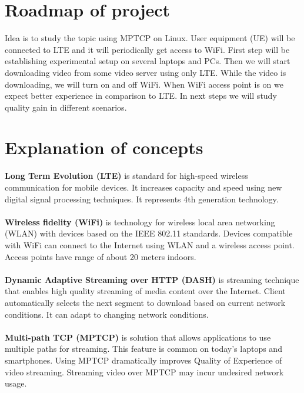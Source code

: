 \documentclass{llncs}
\begin{document}
\section{Roadmap of project}
Idea is to study the topic using MPTCP on Linux. User equipment (UE) will be connected to LTE and it will periodically get access to WiFi. First step will be establishing experimental setup on several laptops and PCs. Then we will start downloading video from some video server using only LTE. While the video is downloading, we will turn on and off WiFi. When WiFi access point is on we expect better experience in comparison to LTE.  In next steps we will study quality gain in different scenarios. 


\section{Explanation of concepts}
\textbf{Long Term Evolution (LTE)} is standard for high-speed wireless communication for mobile devices. It increases capacity and speed using new digital signal processing techniques. It represents 4th generation technology. \\  \\
\textbf{Wireless fidelity (WiFi)} is technology for wireless local area networking (WLAN) with devices based on the IEEE 802.11 standards. Devices compatible with WiFi can connect to the Internet using WLAN and a wireless access point. Access points have range of about 20 meters indoors. \\ \\
\textbf{Dynamic Adaptive Streaming over HTTP (DASH) } is streaming technique that enables high quality streaming of media content over the Internet. Client automatically selects the next segment to download based on current network conditions. It can adapt to changing network conditions.\\  \\
\textbf{Multi-path TCP (MPTCP)} is solution that allows applications to use multiple paths for streaming. This feature is common on today's laptops and smartphones. Using MPTCP dramatically improves Quality of Experience of video streaming. Streaming video over MPTCP may incur undesired network usage. 





%
%
\end{document}
